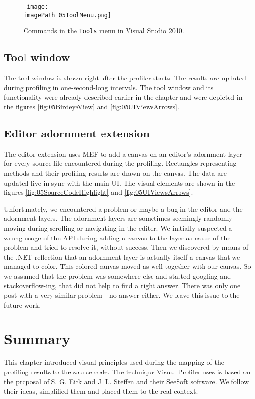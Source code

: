  \begin{figure}
	\centering
		\texttt{[image: \\imagePath 05ToolMenu.png]}
		\caption{Commands in the \texttt{Tools} menu in Visual Studio 2010. }
	\label{fig:05ToolMenu}
\end{figure}

\subsection{Tool window}
The tool window is shown right after the profiler starts. The results are updated during profiling in one-second-long intervals. The tool window and its functionality were already described earlier in the chapter and were depicted in the figures \ref{fig:05BirdeyeView} and \ref{fig:05UIViewsArrows}.

\subsection{Editor adornment extension}
\label{sec:06EditorAdorExt}
The editor extension uses MEF to add a canvas on an editor's adornment layer for every source file encountered during the profiling. Rectangles representing methods and their profiling results are drawn on the canvas. The data are updated live in sync with the main UI. The visual elements are shown in the figures \ref{fig:05SourceCodeHighlight} and \ref{fig:05UIViewsArrows}.

Unfortunately, we encountered a problem or maybe a bug in the editor and the adornment layers. The adornment layers are sometimes seemingly randomly moving during scrolling or navigating in the editor. We initially suspected a wrong usage of the API during adding a canvas to the layer as cause of the problem and tried to resolve it, without success. Then we discovered by means of the .NET reflection that an adornment layer is actually itself a canvas that we managed to color. This colored canvas moved as well together with our canvas. So we assumed that the problem was somewhere else and started googling and stackoverflow-ing, that did not help to find a right answer. There was only one post with a very similar problem - no answer either. We leave this issue to the future work.

\section{Summary}
This chapter introduced visual principles used during the mapping of the profiling results to the source code. The technique Visual Profiler uses is based on the proposal of S. G. Eick and J. L. Steffen and their SeeSoft software. We follow their ideas, simplified them and placed them to the real context.

